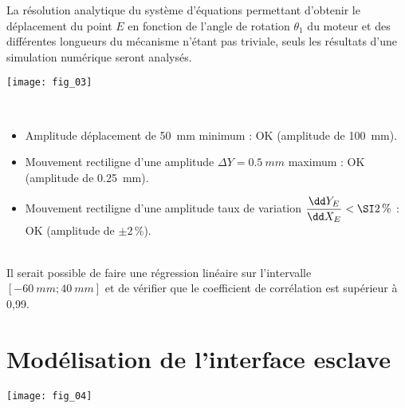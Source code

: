 \ifprof
\else

La résolution analytique du système d’équations permettant d’obtenir le déplacement du
point $E$ en fonction de l’angle de rotation $\theta_1$ du moteur et des différentes longueurs du mécanisme
n’étant pas triviale, seuls les résultats d’une simulation numérique seront analysés.

\begin{center}
\texttt{[image: fig\_03]}
\end{center}
\fi

\ifcolle
\else
{}
\ifprof
\begin{corrige}~\\
\begin{itemize}
\item Amplitude déplacement de \SI{50}{mm} minimum : OK (amplitude de \SI{100}{mm}).
\item Mouvement rectiligne d'une amplitude $\Delta Y= \SI{0,5}{mm}$ maximum : OK (amplitude de \SI{0,25}{mm}).
\item Mouvement rectiligne d'une amplitude taux de variation $\dfrac{\dd Y_E}{\dd X_E}<\SI2\,\%$  : OK  (amplitude de $\pm 2\,\%$).
\end{itemize}
\end{corrige}
\else
\fi

\ifprof
\begin{corrige}~\\
Il serait possible de faire une régression linéaire sur l'intervalle $\left[-\SI{60}{mm}; \SI{40}{mm}\right]$ et de vérifier que le coefficient de corrélation est supérieur à 0,99.
\end{corrige}
\else
\fi
\fi


\ifprof
\newpage
\else
\fi

\section*{Modélisation de l’interface esclave}
\ifprof
\else

\begin{marginfigure}
\texttt{[image: fig\_04]}
\end{marginfigure}

